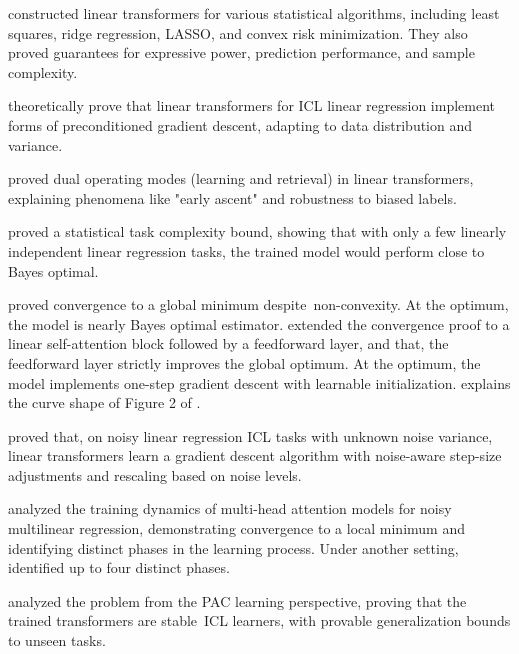 \documentclass[12pt]{article}
\begin{document}
\cite{baiTransformersStatisticiansProvable2023} constructed linear transformers for various statistical algorithms, including least squares, ridge regression, LASSO, and convex risk minimization. They also proved guarantees for expressive power, prediction performance, and sample complexity.

\cite{ahnTransformersLearnImplement2024} theoretically prove that linear transformers for ICL linear regression implement forms of preconditioned gradient descent, adapting to data distribution and variance.

\cite{linDualOperatingModes2024} proved dual operating modes (learning and retrieval) in linear transformers, explaining phenomena like "early ascent" and robustness to biased labels.

\cite{wuHowManyPretraining2024} proved a statistical task complexity bound, showing that with only a few linearly independent linear regression tasks, the trained model would perform close to Bayes optimal.

\cite{zhangTrainedTransformersLearn2024} proved convergence to a global minimum despite non-convexity. At the optimum, the model is nearly Bayes optimal estimator. \cite{zhangInContextLearningLinear2024} extended the convergence proof to a linear self-attention block followed by a feedforward layer, and that, the feedforward layer strictly improves the global optimum. At the optimum, the model implements one-step gradient descent with learnable initialization. \cite{zhangWhatHowDoes2023} explains the curve shape of Figure 2 of \cite{gargWhatCanTransformers2022}.

\cite{vladymyrovLinearTransformersAre2024} proved that, on noisy linear regression ICL tasks with unknown noise variance, linear transformers learn a gradient descent algorithm with noise-aware step-size adjustments and rescaling based on noise levels.

\cite{chenTrainingDynamicsMultiHead2024} analyzed the training dynamics of multi-head attention models for noisy multilinear regression, demonstrating convergence to a local minimum and identifying distinct phases in the learning process. Under another setting, \cite{huangInContextConvergenceTransformers2023} identified up to four distinct phases.

\cite{liTransformersAlgorithmsGeneralization2023} analyzed the problem from the PAC learning perspective, proving that the trained transformers are stable ICL learners, with provable generalization bounds to unseen tasks.
\end{document}
